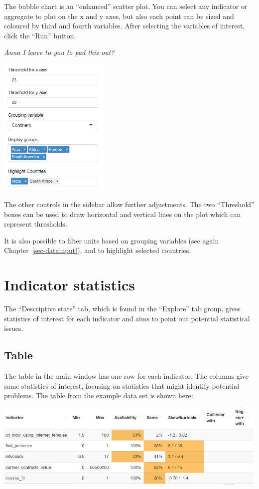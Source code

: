\documentclass[
  letterpaper,
  DIV=11,
  numbers=noendperiod]{scrreprt}
\begin{document}
The bubble chart is an ``enhanced'' scatter plot. You can select any
indicator or aggregate to plot on the x and y axes, but also each point
can be sized and coloured by third and fourth variables. After selecting
the variables of interest, click the ``Run'' button.

\emph{Anna I leave to you to pad this out?}

\includegraphics[width=0.4\textwidth,height=\textheight]{figs/bubble_2.png}

The other controls in the sidebar allow further adjustments. The two
``Threshold'' boxes can be used to draw horizontal and vertical lines on
the plot which can represent thresholds.

It is also possible to filter units based on grouping variables (see
again Chapter~\ref{sec-datainput}), and to highlight selected countries.

\hypertarget{sec-stats}{%
\chapter{Indicator statistics}\label{sec-stats}}

The ``Descriptive stats'' tab, which is found in the ``Explore'' tab
group, gives statistics of interest for each indicator and aims to point
out potential statistical issues.

\hypertarget{table}{%
\section{Table}\label{table}}

The table in the main window has one row for each indicator. The columns
give some statistics of interest, focusing on statistics that might
identify potential problems. The table from the example data set is
shown here:

\includegraphics[width=1\textwidth,height=\textheight]{figs/stats_1.png}
\end{document}
